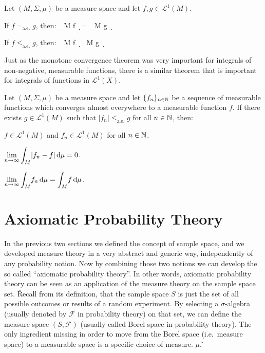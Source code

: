 \bt[]
Let $(M,\Sigma,\mu)$ be a measure space and let $f,g \in \mathscr{L}^1(M)$.
\ben[label=(\roman*)]
\item If $f=_{\mathrm{a.e.}}g$, then:
\bse
\displaystyle \int_M\! f \, \d \mu = \int_M\! g \, \d \mu
\ese

\item If $f\leq_{\mathrm{a.e.}}g$, then:
\bse
\displaystyle \int_M\! f \, \d \mu \leq \int_M\! g \, \d \mu
\ese
\een
\et

Just as the monotone convergence theorem was very important for integrals of non-negative, measurable functions,
there is a similar theorem that is important for integrals of functions in $\mathscr{L}^1(X)$.

Let $(M,\Sigma,\mu)$ be a measure space and let $\{f_n\}_{n\in\mathbb{N}}$ be a sequence of measurable functions which
converges almost everywhere to a measurable function $f$. If there exists $g \in \mathscr{L}^1(M)$ such that $|f_n|
\leq_{\mathrm{a.e.}} g$ for all $n \in \mathbb{N}$, then:
\ben[label=(\roman*)]
\item $f \in \mathscr{L}^1(M)$ and $f_n \in \mathscr{L}^1(M)$ for all $n \in \mathbb{N}$.
\item $\displaystyle \lim_{n \to \infty} \int_M \! |f_n-f| \, \mathrm{d} \mu =0$.
\item $\displaystyle \lim_{n \to \infty} \int_M \! f_n \, \mathrm{d} \mu = \int_M \! f \, \mathrm{d} \mu$.
\een
\et

\section{Axiomatic Probability Theory}

In the previous two sections we defined the concept of sample space, and we developed measure theory in a very
abstract and generic way, independently of any probability notion. Now by combining those two notions we can develop
the so called ``axiomatic probability theory''. In other words, axiomatic probability theory can be seen as an
application of the measure theory on the sample space set. \v

Recall from its definition, that the sample space $S$ is just the set of all possible outcomes or results of a random
experiment. By selecting a $\sigma$-algebra (usually denoted by $\mathcal{F}$ in probability theory) on that set, we
can define the measure space $(S, \mathcal{F})$ (usually called Borel space in probability theory). The only
ingredient missing in order to move from the Borel space (i.e.\ measure space) to a measurable space is a specific
choice of measure. $\mu$. \v

